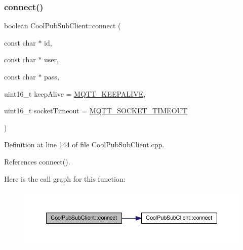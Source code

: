 \subsubsection{\texorpdfstring{connect()}{connect()}\hspace{0.1cm}{\footnotesize\ttfamily [2/4]}}
{\footnotesize\ttfamily boolean Cool\+Pub\+Sub\+Client\+::connect (\begin{DoxyParamCaption}\item[{const char $\ast$}]{id,  }\item[{const char $\ast$}]{user,  }\item[{const char $\ast$}]{pass,  }\item[{uint16\+\_\+t}]{keep\+Alive = {\ttfamily \hyperlink{_cool_pub_sub_client_8h_afb4dd8c75385ab30e659314df7c2c335}{M\+Q\+T\+T\+\_\+\+K\+E\+E\+P\+A\+L\+I\+VE}},  }\item[{uint16\+\_\+t}]{socket\+Timeout = {\ttfamily \hyperlink{_cool_pub_sub_client_8h_a092cc564e4d7f03fdab6137e30a7f05b}{M\+Q\+T\+T\+\_\+\+S\+O\+C\+K\+E\+T\+\_\+\+T\+I\+M\+E\+O\+UT}} }\end{DoxyParamCaption})}



Definition at line 144 of file Cool\+Pub\+Sub\+Client.\+cpp.



References connect().

Here is the call graph for this function\+:\nopagebreak
\begin{figure}[H]
\begin{center}
\leavevmode
\includegraphics[width=350pt]{d8/d4b/class_cool_pub_sub_client_a7f30e39bf4ca5ea5fb9747c403639a03_cgraph}
\end{center}
\end{figure}
\mbox{\label{class_cool_pub_sub_client_af461a5a08fda1c3237e706965704ddb6}} 
